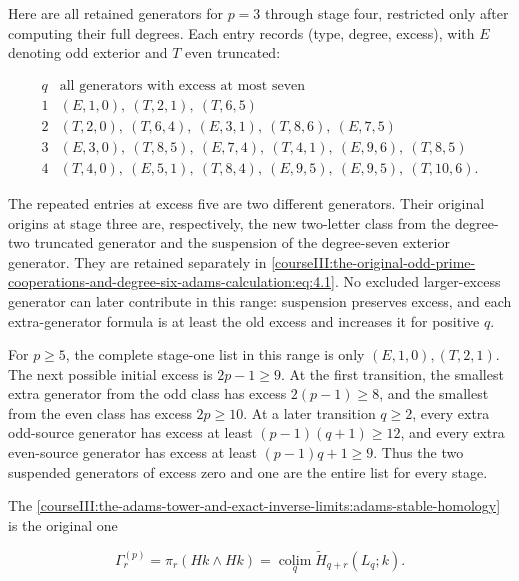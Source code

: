 Here are all retained generators for \(p=3\) through stage four, restricted only after computing their full degrees. Each entry records (type, degree, excess), with \(E\) denoting odd exterior and \(T\) even truncated:

\begin{equation}
\begin{array}{c|l}
q&\text{all generators with excess at most seven}\\\hline
1&(E,1,0),\ (T,2,1),\ (T,6,5)\\
2&(T,2,0),\ (T,6,4),\ (E,3,1),\ (T,8,6),\ (E,7,5)\\
3&(E,3,0),\ (T,8,5),\ (E,7,4),\ (T,4,1),\ (E,9,6),\ (T,8,5)\\
4&(T,4,0),\ (E,5,1),\ (T,8,4),\ (E,9,5),\ (E,9,5),\ (T,10,6).
\end{array}
\label{courseIII:the-original-odd-prime-cooperations-and-degree-six-adams-calculation:eq:4.1}
\end{equation}

The repeated entries at excess five are two different generators. Their original origins at stage three are, respectively, the new two-letter class from the degree-two truncated generator and the suspension of the degree-seven exterior generator. They are retained separately in \eqref{courseIII:the-original-odd-prime-cooperations-and-degree-six-adams-calculation:eq:4.1}. No excluded larger-excess generator can later contribute in this range: suspension preserves excess, and each extra-generator formula is at least the old excess and increases it for positive \(q\).

For \(p\geq5\), the complete stage-one list in this range is only \((E,1,0),(T,2,1)\). The next possible initial excess is \(2p-1\geq9\). At the first transition, the smallest extra generator from the odd class has excess \(2(p-1)\geq8\), and the smallest from the even class has excess \(2p\geq10\). At a later transition \(q\geq2\), every extra odd-source generator has excess at least \((p-1)(q+1)\geq12\), and every extra even-source generator has excess at least \((p-1)q+1\geq9\). Thus the two suspended generators of excess zero and one are the entire list for every stage.

The \cref{courseIII:the-adams-tower-and-exact-inverse-limits:adams-stable-homology} is the original one

\begin{equation}
\Gamma_r^{(p)}=\pi_r(Hk\wedge Hk)
 =\operatorname*{colim}_q\widetilde H_{q+r}(L_q;k).
 \label{courseIII:the-original-odd-prime-cooperations-and-degree-six-adams-calculation:eq:4.2}
\end{equation}

